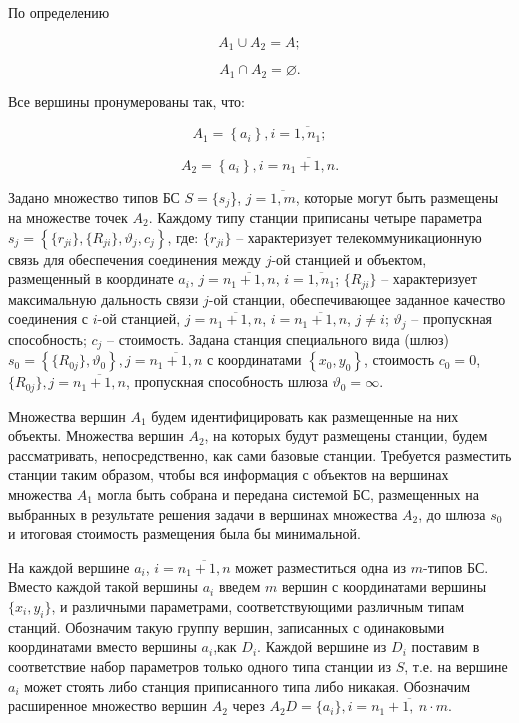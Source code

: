 По определению

$$
A_1 \cup A_2 = A;
$$

$$
A_1 \cap A_2 = \varnothing.
$$

Все вершины пронумерованы так, что:

$$
A_1 = \left\{a_i \right\}, i= \overline{1,n_1};
$$

$$
A_2 = \left\{ a_i  \right\}, i= \overline{n_1+1,n}.
$$


Задано множество типов БС $S = \{s_j$\}, $j=\overline{1,m}$, которые могут быть размещены на множестве точек $A_2$. Каждому типу станции приписаны четыре параметра $s_j = \left\{\{r_{ji}\}, \{R_{ji}\}, \vartheta_j, c_j \right\}$, где:  $\{r_{ji}\}$ -- характеризует телекоммуникационную связь для обеспечения соединения между $j$-ой станцией и объектом, размещенный в координате $a_i$, $j= \overline{n_1+1,n}$, $i= \overline{1,n_1}$; $\{R_{ji}\}$ --  характеризует максимальную дальность связи $j$-ой станции, обеспечивающее заданное качество соединения с $i$-ой станцией, $j= \overline{n_1+1,n}$, $i= \overline{n_1+1,n}$, $j \neq i$; $\vartheta_j$ -- пропускная способность; $c_j$ -- стоимость. Задана станция специального вида (шлюз) $s_0 = \left\{ \{R_{0j}\}, \vartheta_0 \right\}, j = \overline{n_1+1,n}$ с координатами $\left\{x_0, y_0 \right\}$, стоимость $c_0 = 0$, $\{R_{0j}\}, j = \overline{n_1+1,n}$, пропускная способность шлюза $\vartheta_0 = \infty$.


Множества вершин $A_1$ будем идентифицировать как размещенные на них объекты. Множества вершин $A_2$, на которых будут размещены станции, будем рассматривать, непосредственно, как сами базовые станции.  Требуется разместить станции таким образом, чтобы вся информация с объектов на вершинах множества $A_1$ могла быть собрана и передана системой БС, размещенных на выбранных в результате решения задачи в вершинах множества  $A_2$, до шлюза $s_0$ и итоговая стоимость размещения была бы минимальной.


На каждой вершине $a_i$, $i= \overline{n_1+1,n}$ может разместиться одна из $m$-типов БС. Вместо каждой такой вершины $a_i$ введем $m$ вершин с координатами вершины $\{x_i, y_i \}$, и различными параметрами, соответствующими различным типам станций. Обозначим такую группу вершин, записанных с одинаковыми координатами вместо вершины $a_i$,как $D_i$. Каждой вершине из $D_i$ поставим в соответствие набор параметров только одного типа станции из $S$, т.е. на вершине $a_i$ может стоять либо станция приписанного типа либо никакая. Обозначим расширенное множество вершин $A_2$ через $A_2D = \{a_i\}, i = \overline{n_1 + 1,\ n \cdot m}$.


